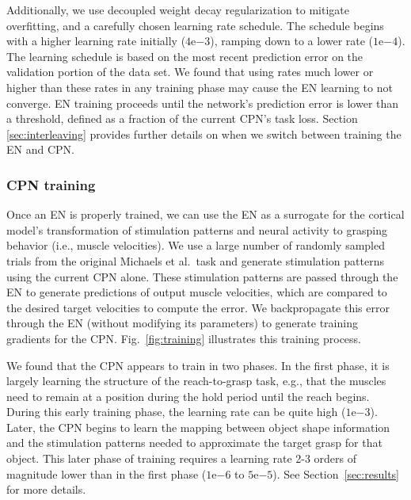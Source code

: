\documentclass[12pt]{iopart}
\begin{document}
Additionally, we use decoupled weight decay regularization \cite{loshchilov2017decoupled} to
mitigate overfitting, and a carefully chosen learning rate schedule. The schedule begins with
a higher learning rate initially ($4\mathrm{e}{-3}$), ramping down to a lower rate ($1\mathrm{e}{-4}$).
The learning schedule is based on the most recent prediction error on the validation portion of the
data set. We found that using rates much lower or higher than these rates in any training phase
may cause the EN learning to not converge. EN training proceeds until the network's prediction error
is lower than a threshold, defined as a fraction of the current CPN's task loss. Section
\ref{sec:interleaving} provides further details on when we switch between training the EN and CPN.

\subsubsection{CPN training}
Once an EN is properly trained, we can use the EN as a surrogate for the cortical model's transformation
of stimulation patterns and neural activity to grasping behavior (i.e., muscle velocities). We use a large number
of randomly sampled trials from the original Michaels et al.\ task \cite{michaels.mrnn} and generate
stimulation patterns using the current CPN alone. These stimulation patterns are passed through the EN
to generate predictions of output muscle velocities, which are compared to the desired target velocities
to compute the error. We backpropagate this error through the EN (without modifying its parameters) to
generate training gradients for the CPN. Fig.~\ref{fig:training} illustrates this training process.

We found that the CPN appears to train in two phases. In the first phase, it is largely learning the structure
of the reach-to-grasp task, e.g., that the muscles need to remain at a position during the hold period until the
reach begins. During this early training phase, the learning rate can be quite high ($1\mathrm{e}{-3}$). Later, the CPN
begins to learn the mapping between object shape information and the stimulation patterns needed to approximate
the target grasp for that object. This later phase of training requires a learning rate 2-3 orders of magnitude
lower than in the first phase ($1\mathrm{e}{-6}$ to $5\mathrm{e}{-5}$). See Section~\ref{sec:results} for more details.
\end{document}
